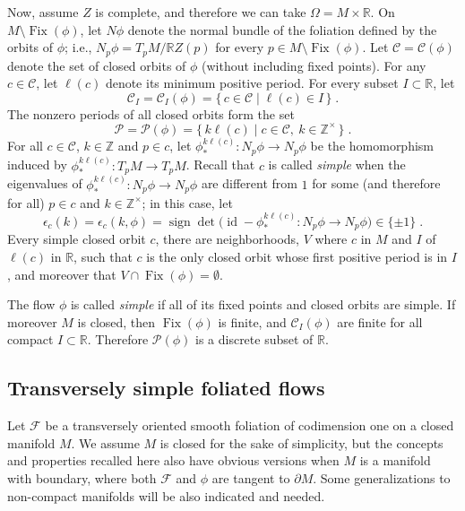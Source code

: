 \documentclass{memo-l}
\theoremstyle{plain}
\theoremstyle{definition}
\theoremstyle{remark}
\newcommand{\R}{\mathbb{R}}
\newcommand{\Z}{\mathbb{Z}}
\newcommand{\CC}{\mathcal{C}}
\newcommand{\FF}{\mathcal{F}}
\newcommand{\PP}{\mathcal{P}}
\newcommand{\id}{\operatorname{id}}
\newcommand{\sign}{\operatorname{sign}}
\newcommand{\Fix}{\operatorname{Fix}}
\numberwithin{section}{chapter}
\numberwithin{equation}{section}%
\begin{document}
Now, assume $Z$ is complete, and therefore we can take $\Omega=M\times\R$. On $M\setminus\Fix(\phi)$, let $N\phi$ denote the normal bundle of the foliation defined by the orbits of $\phi$; i.e., $N_p\phi=T_pM/\R Z(p)$ for every $p\in M\setminus\Fix(\phi)$. Let $\CC=\CC(\phi)$\index{$\CC(\phi)$} denote the set of closed orbits of $\phi$ (without including fixed points). For any $c\in\CC$, let $\ell(c)$ denote its minimum positive period. For every subset $I\subset\R$, let \index{$\CC_I(\phi)$}
\[
\CC_I=\CC_I(\phi)=\{\,c\in\CC\mid\ell(c)\in I\,\}\;.
\]
The nonzero periods of all closed orbits form the set\index{$\PP(\phi)$}
\[
\PP=\PP(\phi)=\{\,k\ell(c)\mid c\in\CC,\ k\in\Z^\times\,\}\;.
\]
For all $c\in\CC$, $k\in\Z$ and $p\in c$, let $\phi^{k\ell(c)}_*:N_p\phi\to N_p\phi$ be the homomorphism induced by $\phi^{k\ell(c)}_*:T_pM\to T_pM$. Recall that $c$ is called \emph{simple} when the eigenvalues of $\phi^{k\ell(c)}_*:N_p\phi\to N_p\phi$ are different from $1$ for some (and therefore for all) $p\in c$ and $k\in\Z^\times$; in this case, let
\[
  \epsilon_c(k)=\epsilon_c(k,\phi)=\sign\det\big(\id-\phi^{k\ell(c)}_*:N_p\phi\to N_p\phi\big)\in\{\pm1\}\;.
\]
Every simple closed orbit $c$, there are neighborhoods, $V$ where $c$ in $M$ and $I$ of $\ell(c)$ in $\R$, such that $c$ is the only closed orbit whose first positive period is in $I$, and moreover that $V\cap\Fix(\phi)=\emptyset$.

The flow $\phi$ is called \emph{simple} if all of its fixed points and closed orbits are simple. If moreover $M$ is closed, then $\Fix(\phi)$ is finite, and $\CC_I(\phi)$ are finite for all compact $I\subset\R$. Therefore $\PP(\phi)$ is a discrete subset of $\R$. 



\subsection{Transversely simple foliated flows}\label{ss: simple fol flows}

Let $\FF$ be a transversely oriented smooth foliation of codimension one on a closed manifold $M$. We assume $M$ is closed for the sake of simplicity, but the concepts and properties recalled here also have obvious versions when $M$ is a manifold with boundary, where both $\FF$ and $\phi$ are tangent to $\partial M$. Some generalizations to non-compact manifolds will be also indicated and needed.
\end{document}
